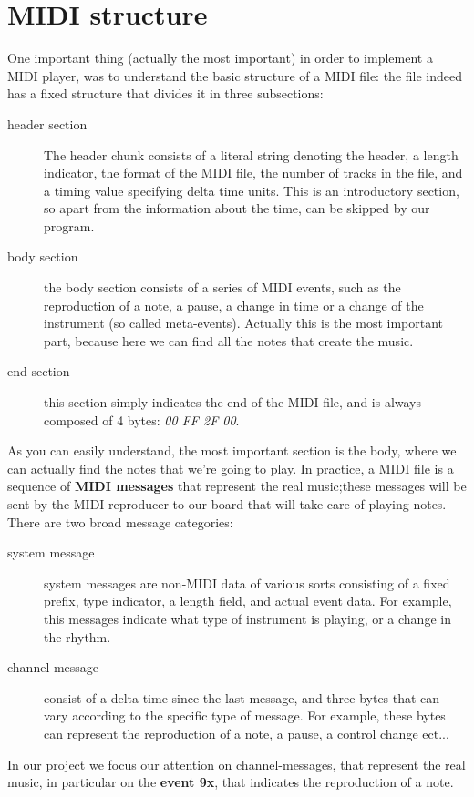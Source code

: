 \documentclass[12pt]{article}
\begin{document}
\section{MIDI structure} \label{sec:structure}
One important thing (actually the most important) in order to implement a MIDI player, was to understand the basic structure of a MIDI file: the file indeed has a fixed structure that divides it in three subsections: 
\begin{description} 
	\item[header section] The header chunk consists of a literal string denoting the header, a length indicator, the format of the MIDI file, the number of tracks in the file, and a timing value specifying delta time units. This is an introductory section, so apart from the information about the time, can be skipped by our program.
	\item[body section] the body section consists of a series of MIDI events, such as the reproduction of a note, a pause, a change in time or a change of the instrument (so called meta-events). Actually this is the most important part, because here we can find all the notes that create the music.
	\item[end section] this section simply indicates the end of the MIDI file, and is always composed of 4 bytes: \emph{00 FF 2F 00}.
\end{description}
As you can easily understand, the most important section is the body, where we can actually find the notes that we're going to play. In practice, a MIDI file is a sequence of \textbf{MIDI messages} that represent the real music;these messages will be sent by the MIDI reproducer to our board that will take care of playing notes. \newline 
There are two broad message categories: 
\begin{description} 
	\item[system message] system messages are non-MIDI data of various sorts consisting of a fixed prefix, type indicator, a length field, and actual event data. For example, this messages indicate what type of instrument is playing, or a change in the rhythm.
	\item[channel message] consist of a delta time since the last message, and three bytes that can vary according to the specific type of message. For example, these bytes can represent the reproduction of a note, a pause, a control change ect...
\end{description}
In our project we focus our attention on channel-messages, that represent the real music, in particular on the \textbf{event 9x}, that indicates the reproduction of a note.
\end{document}
